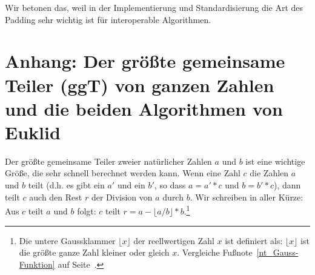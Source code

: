 \begin{refsegment}
Wir betonen das, weil in der Implementierung und Standardisierung die Art
des Padding sehr wichtig ist für interoperable Algorithmen.




\newpage
\hypertarget{nt:NumberTheory_Appendix_GCD}{}
\section[Anhang: Der ggT und die beiden Algorithmen von Euklid]
        {Anhang: Der größte gemeinsame Teiler (ggT) von ganzen Zahlen und die beiden
	 Algorithmen von Euklid\footnotemark}
\label{nt:NumberTheory_Appendix_GCD}

Der größte gemeinsame Teiler zweier natürlicher Zahlen $a$ und $b$ ist eine
wichtige Größe, die sehr schnell berechnet werden kann. Wenn eine Zahl $c$ die
Zahlen $a$ und $b$ teilt (d.h. es gibt ein $a'$ und ein $b'$, so dass
$a = a'*c$ und $b = b'*c$), dann teilt $c$ auch den Rest $r$ der Division von
$a$ durch $b$. Wir schreiben in aller Kürze:
Aus $c$ teilt $a$ und $b$ folgt:
$c$ teilt $r = a - \lfloor a/b \rfloor * b$.\footnote{\label{nt_Gauss-Klammer}%
Die untere Gaussklammer  $\lfloor x \rfloor $ der
reellwertigen Zahl $x$ ist definiert als: $\lfloor x \rfloor $ ist die größte
ganze Zahl kleiner oder gleich $x$.
Vergleiche Fußnote~\ref{nt_Gauss-Funktion} auf Seite~\pageref{nt_Gauss-Funktion}.
}


\end{refsegment}
